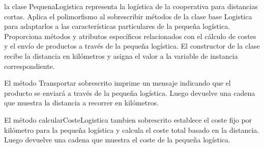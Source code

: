 \documentclass[10pt,a4paper]{article}
\begin{document}
la clase PequenaLogistica representa la logística de la cooperativa para distancias cortas. Aplica el polimorfismo al sobrescribir métodos de la clase base Logistica para adaptarlos a las características particulares de la pequeña logística. Proporciona métodos y atributos específicos relacionados con el cálculo de costes y el envío de productos a través de la pequeña logística.
El constructor de la clase recibe la distancia en kilómetros y asigna el valor a la variable de instancia correspondiente.

El método Transportar sobrescrito imprime un mensaje indicando que el producto se enviará a través de la pequeña logística. Luego devuelve una cadena que muestra la distancia a recorrer en kilómetros.

El método calcularCosteLogistica tambien sobrescrito establece el coste fijo por kilómetro para la pequeña logística y calcula el coste total basado en la distancia. Luego devuelve una cadena que muestra el coste de la pequeña logística.
\end{document}
